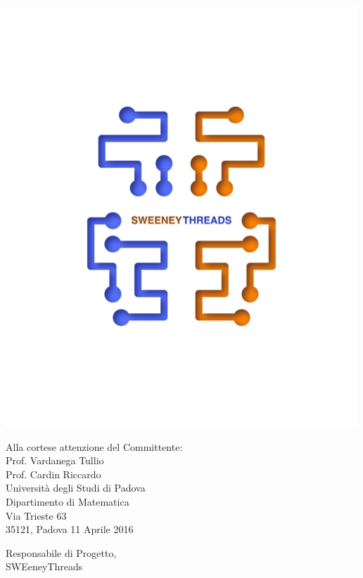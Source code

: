 \documentclass[a4paper]{article}
\begin{document}
	\noindent\begin{minipage}{0.3\textwidth}
		\includegraphics[scale=0.6]{sweeney.png}
	\end{minipage}
	\begin{minipage}{0.7\textwidth}
		\begin{flushright}
			Alla cortese attenzione del Committente: \\
			Prof. Vardanega Tullio \\
			Prof. Cardin Riccardo \\
			Università degli Studi di Padova \\
			Dipartimento di Matematica \\
			Via Trieste 63\\
			35121, Padova
			\vspace{5mm} 11 Aprile 2016
		\end{flushright}
	\end{minipage}
	
	\begin{minipage}{\textwidth}
		\begin{flushleft}
			Responsabile di Progetto,\\
			SWEeneyThreads\\
		\end{flushleft}
	\end{minipage}	
\end{document}
